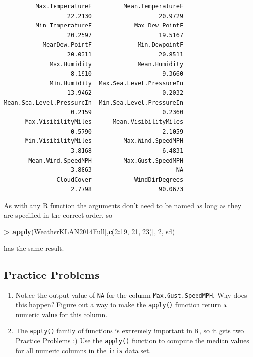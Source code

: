 \documentclass[]{krantz}
\makeatletter
\newenvironment{Shaded}{\begin{snugshade}}{\end{snugshade}}
\newcommand{\KeywordTok}[1]{\textcolor[rgb]{0.27,0.27,0.27}{\textbf{#1}}}
\newcommand{\DecValTok}[1]{\textcolor[rgb]{0.06,0.06,0.06}{#1}}
\newcommand{\StringTok}[1]{\textcolor[rgb]{0.5,0.5,0.5}{#1}}
\newcommand{\OperatorTok}[1]{\textcolor[rgb]{0.43,0.43,0.43}{\textbf{#1}}}
\newcommand{\NormalTok}[1]{#1}
\providecommand{\tightlist}{%
  \setlength{\itemsep}{0pt}\setlength{\parskip}{0pt}}
\newenvironment{kframe}{%
\medskip{}
\setlength{\fboxsep}{.8em}
 \def\at@end@of@kframe{}%
 \ifinner\ifhmode%
  \def\at@end@of@kframe{\end{minipage}}%
  \begin{minipage}{\columnwidth}%
 \fi\fi%
 \def\FrameCommand##1{\hskip\@totalleftmargin \hskip-\fboxsep
 \colorbox{shadecolor}{##1}\hskip-\fboxsep
     \hskip-\linewidth \hskip-\@totalleftmargin \hskip\columnwidth}%
 \MakeFramed {\advance\hsize-\width
   \@totalleftmargin\z@ \linewidth\hsize
   \@setminipage}}%
 {\par\unskip\endMakeFramed%
 \at@end@of@kframe}
\renewenvironment{Shaded}{\begin{kframe}}{\end{kframe}}
\makeatother
\begin{document}
\begin{verbatim}
         Max.TemperatureF         Mean.TemperatureF 
                  22.2130                   20.9729 
         Min.TemperatureF            Max.Dew.PointF 
                  20.2597                   19.5167 
           MeanDew.PointF             Min.DewpointF 
                  20.0311                   20.8511 
             Max.Humidity             Mean.Humidity 
                   8.1910                    9.3660 
             Min.Humidity  Max.Sea.Level.PressureIn 
                  13.9462                    0.2032 
Mean.Sea.Level.PressureIn  Min.Sea.Level.PressureIn 
                   0.2159                    0.2360 
      Max.VisibilityMiles      Mean.VisibilityMiles 
                   0.5790                    2.1059 
      Min.VisibilityMiles         Max.Wind.SpeedMPH 
                   3.8168                    6.4831 
       Mean.Wind.SpeedMPH         Max.Gust.SpeedMPH 
                   3.8863                        NA 
               CloudCover            WindDirDegrees 
                   2.7798                   90.0673 
\end{verbatim}

As with any R function the arguments don't need to be named as long as
they are specified in the correct order, so

\begin{Shaded}
\begin{Highlighting}[]
\OperatorTok{>}\StringTok{ }\KeywordTok{apply}\NormalTok{(WeatherKLAN2014Full[,}\KeywordTok{c}\NormalTok{(}\DecValTok{2}\OperatorTok{:}\DecValTok{19}\NormalTok{, }\DecValTok{21}\NormalTok{, }\DecValTok{23}\NormalTok{)], }\DecValTok{2}\NormalTok{, sd)}
\end{Highlighting}
\end{Shaded}

has the same result.

\subsection{Practice Problems}\label{practice-problems}

\begin{enumerate}
\def\labelenumi{\alph{enumi}.}
\tightlist
\item
  Notice the output value of \texttt{NA} for the column
  \texttt{Max.Gust.SpeedMPH}. Why does this happen? Figure out a way to
  make the \texttt{apply()} function return a numeric value for this
  column.
\item
  The \texttt{apply()} family of functions is extremely important in R,
  so it gets two Practice Problems :) Use the \texttt{apply()} function
  to compute the median values for all numeric columns in the
  \texttt{iris} data set.
\end{enumerate}
\end{document}
